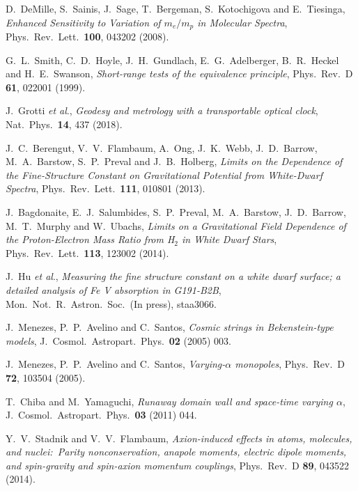 \documentclass[aps,prd,onecolumn,nofootinbib]{revtex4-2} %
\begin{document}
\begin{thebibliography}{99}
 D.~DeMille, S.~Sainis, J.~Sage, T.~Bergeman, S.~Kotochigova and E.~Tiesinga, \textit{Enhanced Sensitivity to Variation of $m_e / m_p$ in Molecular Spectra}, Phys.~Rev.~Lett.~\textbf{100}, 043202 (2008). 


 G.~L.~Smith, C.~D.~Hoyle, J.~H.~Gundlach, E.~G.~Adelberger, B.~R.~Heckel and H.~E.~Swanson, \textit{Short-range tests of the equivalence principle}, Phys.~Rev.~D \textbf{61}, 022001 (1999). 


 J.~Grotti \textit{et al}., \textit{Geodesy and metrology with a transportable optical clock}, Nat.~Phys.~\textbf{14}, 437 (2018). 


 J.~C.~Berengut, V.~V.~Flambaum, A.~Ong, J.~K.~Webb, J.~D.~Barrow, M.~A.~Barstow, S.~P.~Preval and J.~B.~Holberg, \textit{Limits on the Dependence of the Fine-Structure Constant on Gravitational Potential from White-Dwarf Spectra}, Phys.~Rev.~Lett.~\textbf{111}, 010801 (2013). 

 J.~Bagdonaite, E.~J.~Salumbides, S.~P.~Preval, M.~A.~Barstow, J.~D.~Barrow, M.~T.~Murphy and W.~Ubachs, \textit{Limits on a Gravitational Field Dependence of the Proton-Electron Mass Ratio from H$_2$ in White Dwarf Stars}, Phys.~Rev.~Lett.~\textbf{113}, 123002 (2014). 

 J.~Hu \textit{et al}., \textit{Measuring the fine structure constant on a white dwarf surface; a detailed analysis of Fe V absorption in G191-B2B}, Mon.~Not.~R.~Astron.~Soc.~(In press), staa3066. 


 J.~Menezes, P.~P.~Avelino and C.~Santos, \textit{Cosmic strings in Bekenstein-type models}, J.~Cosmol.~Astropart.~Phys.~\textbf{02} (2005) 003. 

 J.~Menezes, P.~P.~Avelino and C.~Santos, \textit{Varying-$\alpha$ monopoles}, Phys.~Rev.~D \textbf{72}, 103504 (2005). 

 T.~Chiba and M.~Yamaguchi, \textit{Runaway domain wall and space-time varying $\alpha$}, J.~Cosmol.~Astropart.~Phys.~\textbf{03} (2011) 044. 


 Y.~V.~Stadnik and V.~V.~Flambaum, \textit{Axion-induced effects in atoms, molecules, and nuclei:~Parity nonconservation, anapole moments, electric dipole moments, and spin-gravity and spin-axion momentum couplings}, Phys.~Rev.~D \textbf{89}, 043522 (2014). 


\end{thebibliography}
\end{document}
